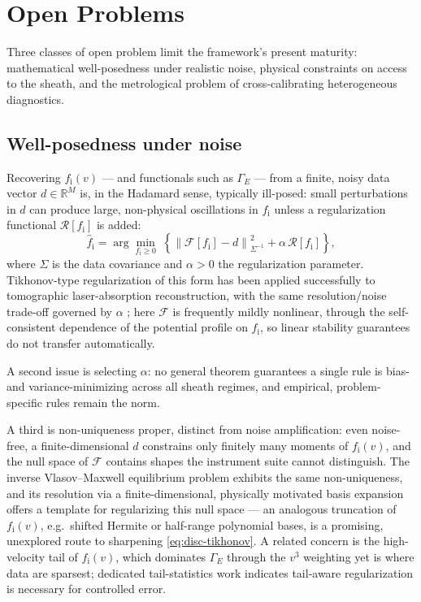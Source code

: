 \section{Open Problems}
\label{sec:disc-open}

Three classes of open problem limit the framework's present maturity: mathematical well-posedness under realistic noise, physical constraints on access to the sheath, and the metrological problem of cross-calibrating heterogeneous diagnostics.

\subsection{Well-posedness under noise}
\label{subsec:disc-wellposed}

Recovering $f_{\mathrm{i}}(v)$ — and functionals such as $\Gamma_{E}$ — from a finite, noisy data vector $d \in \mathbb{R}^{M}$ is, in the Hadamard sense, typically ill-posed: small perturbations in $d$ can produce large, non-physical oscillations in $f_{\mathrm{i}}$ unless a regularization functional $\mathcal{R}[f_{\mathrm{i}}]$ is added:
\begin{equation}
\hat{f}_{\mathrm{i}} = \arg\min_{f_{\mathrm{i}} \geq 0} \; \left\{ \left\| \mathcal{F}[f_{\mathrm{i}}] - d \right\|_{\Sigma^{-1}}^{2} + \alpha \, \mathcal{R}[f_{\mathrm{i}}] \right\},
\label{eq:disc-tikhonov}
\end{equation}
where $\Sigma$ is the data covariance and $\alpha>0$ the regularization parameter. Tikhonov-type regularization of this form has been applied successfully to tomographic laser-absorption reconstruction, with the same resolution/noise trade-off governed by $\alpha$ \cite{ref0677}; here $\mathcal{F}$ is frequently mildly nonlinear, through the self-consistent dependence of the potential profile on $f_{\mathrm{i}}$, so linear stability guarantees do not transfer automatically.

A second issue is selecting $\alpha$: no general theorem guarantees a single rule is bias- and variance-minimizing across all sheath regimes, and empirical, problem-specific rules remain the norm.

A third is non-uniqueness proper, distinct from noise amplification: even noise-free, a finite-dimensional $d$ constrains only finitely many moments of $f_{\mathrm{i}}(v)$, and the null space of $\mathcal{F}$ contains shapes the instrument suite cannot distinguish. The inverse Vlasov--Maxwell equilibrium problem exhibits the same non-uniqueness, and its resolution via a finite-dimensional, physically motivated basis expansion offers a template for regularizing this null space — an analogous truncation of $f_{\mathrm{i}}(v)$, e.g.\ shifted Hermite or half-range polynomial bases, is a promising, unexplored route to sharpening \cref{eq:disc-tikhonov}. A related concern is the high-velocity tail of $f_{\mathrm{i}}(v)$, which dominates $\Gamma_{E}$ through the $v^{3}$ weighting yet is where data are sparsest; dedicated tail-statistics work \cite{ref0096} indicates tail-aware regularization is necessary for controlled error.

